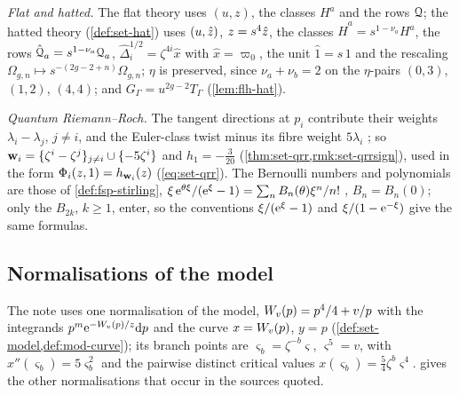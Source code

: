 \emph{Flat and hatted.} The flat theory uses $(u,z)$, the classes $H^a$ and the rows $\mathcal{Q}$; the hatted theory (\cref{def:set-hat}) uses $(u,\hat{z})$, $z=s^4\hat{z}$, the classes $\hat H^a=s^{1-\nu_a}H^a$, the rows $\hat{\mathcal{Q}}_a=s^{1-\nu_a}\mathcal{Q}_a$, $\hat\Delta_i^{1/2}=\zeta^{4i}\hat x$ with $\hat x=\varpi_0$, the unit $\hat1=s\,1$ and the rescaling $\Omega_{g,n}\mapsto s^{-(2g-2+n)}\Omega_{g,n}$; $\eta$ is preserved, since $\nu_a+\nu_b=2$ on the $\eta$-pairs $(0,3)$, $(1,2)$, $(4,4)$; and $G_\Gamma=u^{2g-2}T_\Gamma$ (\cref{lem:flh-hat}).

\emph{Quantum Riemann--Roch.} The tangent directions at $p_i$ contribute their weights $\lambda_i-\lambda_j$, $j\neq i$, and the Euler-class twist minus its fibre weight $5\lambda_i$ \cite[(10)]{LP20}; so $\mathbf{w}_i=\{\zeta^i-\zeta^j\}_{j\neq i}\cup\{-5\zeta^i\}$ and $h_1=-\frac3{20}$ (\cref{thm:set-qrr,rmk:set-qrrsign}), used in the form $\Phi_i(z,1)=h_{\mathbf{w}_i}(z)$ (\cref{eq:set-qrr}). The Bernoulli numbers and polynomials are those of \cref{def:fsp-stirling}, $\xi\,\mathrm{e}^{\theta\xi}/(\mathrm{e}^\xi-1)=\sum_nB_n(\theta)\xi^n/n!$ \cite[24.2.3]{DLMF}, $B_n=B_n(0)$; only the $B_{2k}$, $k\geq1$, enter, so the conventions $\xi/(\mathrm{e}^\xi-1)$ and $\xi/(1-\mathrm{e}^{-\xi})$ give the same formulas.

\subsection{Normalisations of the model}
\label{sec:sgn-model}

The note uses one normalisation of the model, $W_{v}(p)=p^4/4+v/p$ with the integrands $p^m\mathrm{e}^{-W_{v}(p)/z}\mathrm{d} p$ and the curve $x=W_{v}(p)$, $y=p$ (\cref{def:set-model,def:mod-curve}); its branch points are $\varsigma_b=\zeta^{-b}\varsigma$, $\varsigma^5=v$, with $x''(\varsigma_b)=5\varsigma_b^2$ and the pairwise distinct critical values $x(\varsigma_b)=\frac54\zeta^b\varsigma^4$.  gives the other normalisations that occur in the sources quoted.

